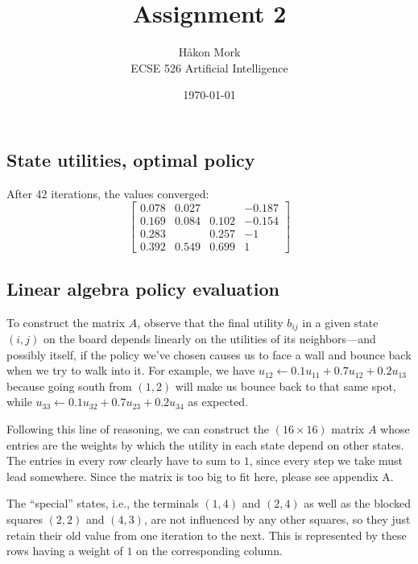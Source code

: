 \documentclass[letterpaper, 10pt]{article}
\title{\textbf{Assignment 2}}
\author{Håkon Mork \\ ECSE 526 Artificial Intelligence}
\date{\today}
\begin{document}
\maketitle
\noindent
\begin{multicols}{2}

\section{}
\subsection{State utilities, optimal policy}
After 42 iterations, the values converged:
\[
	\begin{bmatrix}
		0.078 & 0.027 &       & -0.187 \\
		0.169 & 0.084 & 0.102 & -0.154 \\
		0.283 &       & 0.257 & -1 \\
		0.392 & 0.549 & 0.699 & 1
	\end{bmatrix}
\]


\subsection{Linear algebra policy evaluation}
To construct the matrix $A$, observe that the final utility $b_{ij}$ in a given state $(i, j)$ on the board depends linearly on the utilities of its neighbors---and possibly itself, if the policy we've chosen causes us to face a wall and bounce back when we try to walk into it. For example, we have  $u_{12} \leftarrow 0.1 u_{11} + 0.7 u_{12} + 0.2 u_{13}$ because going south from $(1,2)$ will make us bounce back to that same spot, while $u_{33} \leftarrow 0.1 u_{32} + 0.7 u_{23} + 0.2 u_{34}$ as expected. 

Following this line of reasoning, we can construct the $(16 \times 16)$ matrix $A$ whose entries are the weights by which the utility in each state depend on other states. The entries in every row clearly have to sum to $1$, since every step we take must lead somewhere. Since the matrix is too big to fit here, please see appendix A.

The ``special'' states, i.e., the terminals $(1,4)$ and $(2,4)$ as well as the blocked squares $(2,2)$ and $(4,3)$, are not influenced by any other squares, so they just retain their old value from one iteration to the next. This is represented by these rows having a weight of $1$ on the corresponding column.



\end{multicols}
\end{document}
